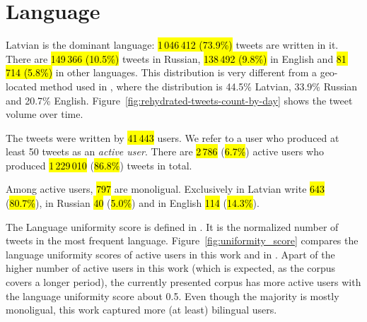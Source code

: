 \documentclass{IOS-Book-Article}
\begin{document}



\section{Language}
\label{sec:language}


Latvian is the dominant language: \hl{1\,046\,412 (73.9\%)} tweets are written in it.\footnotemark{} There are \hl{149\,366 (10.5\%)} tweets in Russian, \hl{138\,492 (9.8\%)} in English and \hl{81\,714 (5.8\%)} in other languages. This distribution is very different from a geo-located method used in \cite{milajevs:2017:BUCC}, where the distribution is 44.5\% Latvian, 33.9\% Russian and 20.7\% English. Figure~\ref{fig:rehydrated-tweets-count-by-day} shows the tweet volume over time.

The tweets were written by \hl{41\,443} users. We refer to a user who produced at least 50 tweets as an \textit{active user}. There are \hl{2\,786} (\hl{6.7\%}) active users who produced \hl{1\,229\,010} (\hl{86.8\%}) tweets in total.

Among active users, \hl{797} are monoligual. Exclusively in Latvian write \hl{643} (\hl{80.7\%}), in Russian \hl{40} (\hl{5.0\%}) and in English \hl{114} (\hl{14.3\%}).

The Language uniformity score is defined in \cite{milajevs:2017:BUCC}. It is the normalized number of tweets in the most frequent language. Figure~\ref{fig:uniformity_score} compares the language uniformity scores of active users in this work and in \cite{milajevs:2017:BUCC}. Apart of the higher number of active users in this work (which is expected, as the corpus covers a longer period), the currently presented corpus has more active users with the language uniformity score about 0.5. Even though the majority is mostly monoligual, this work captured more (at least) bilingual users.
\end{document}
